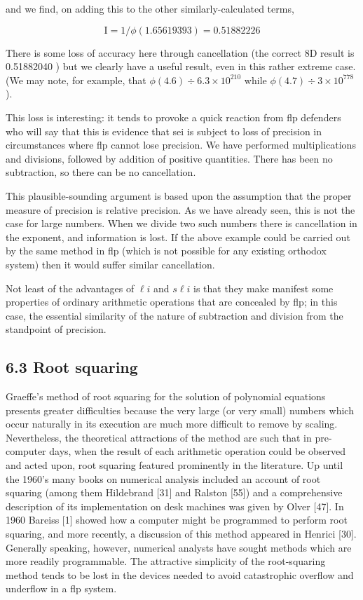 \documentclass[10pt]{article}
\begin{document}
and we find, on adding this to the other similarly-calculated terms,

$$
\mathrm{I}=1 / \phi(1.65619393)=0.51882226
$$

There is some loss of accuracy here through cancellation (the correct 8D result is 0.51882040 ) but we clearly have a useful result, even in this rather extreme case. (We may note, for example, that $\phi(4.6) \div 6.3 \times 10^{210}$ while $\phi(4.7) \div 3 \times 10^{778}$ ).

This loss is interesting: it tends to provoke a quick reaction from flp defenders who will say that this is evidence that sei is subject to loss of precision in circumstances where flp cannot lose precision. We have performed multiplications and divisions, followed by addition of positive quantities. There has been no subtraction, so there can be no cancellation.

This plausible-sounding argument is based upon the assumption that the proper measure of precision is relative precision. As we have already seen, this is not the case for large numbers. When we divide two such numbers there is cancellation in the exponent, and information is lost. If the above example could be carried out by the same method in flp (which is not possible for any existing orthodox system) then it would suffer similar cancellation.

Not least of the advantages of $\ell i$ and $s \ell i$ is that they make manifest some properties of ordinary arithmetic operations that are concealed by flp; in this case, the essential similarity of the nature of subtraction and division from the standpoint of precision.

\subsection*{6.3 Root squaring}
Graeffe's method of root squaring for the solution of polynomial equations presents greater difficulties because the very large (or very small) numbers which occur naturally in its execution are much more difficult to remove by scaling. Nevertheless, the theoretical attractions of the method are such that in pre-computer days, when the result of each arithmetic operation could be observed and acted upon, root squaring featured prominently in the literature. Up until the 1960's many books on numerical analysis included an account of root squaring (among them Hildebrand [31] and Ralston [55]) and a comprehensive description of its implementation on desk machines was given by Olver [47]. In 1960 Bareiss [1] showed how a computer might be programmed to perform root squaring, and more recently, a discussion of this method appeared in Henrici [30]. Generally speaking, however, numerical analysts have sought methods which are more readily programmable. The attractive simplicity of the root-squaring method tends to be lost in the devices needed to avoid catastrophic overflow and underflow in a flp system.
\end{document}
